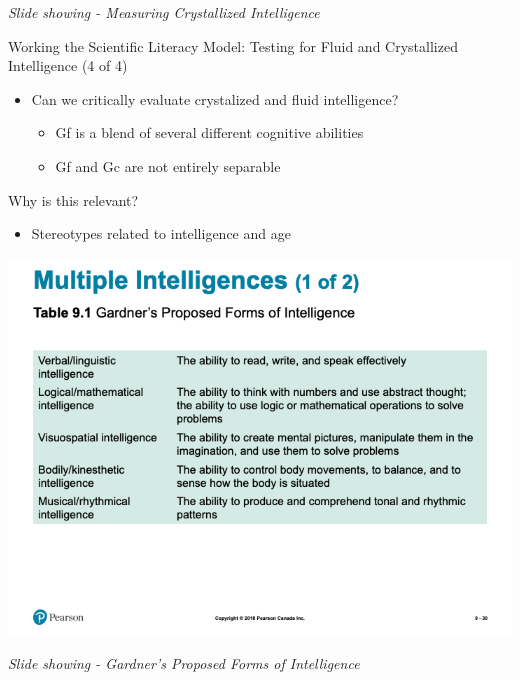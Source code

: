 \documentclass[
]{book}
\providecommand{\tightlist}{%
  \setlength{\itemsep}{0pt}\setlength{\parskip}{0pt}}
\begin{document}
\begin{reflect}
\emph{Slide showing - Measuring Crystallized Intelligence}

Working the Scientific Literacy Model: Testing for Fluid and Crystallized Intelligence (4 of 4)

\begin{itemize}
\tightlist
\item
  Can we critically evaluate crystalized and fluid intelligence?

  \begin{itemize}
  \tightlist
  \item
    Gf is a blend of several different cognitive abilities\\
  \item
    Gf and Gc are not entirely separable
  \end{itemize}
\end{itemize}

Why is this relevant?

\begin{itemize}
\tightlist
\item
  Stereotypes related to intelligence and age
\end{itemize}

\includegraphics{assets/unit_2/slide_30.png}

\emph{Slide showing - Gardner's Proposed Forms of Intelligence}


\end{reflect}
\end{document}

